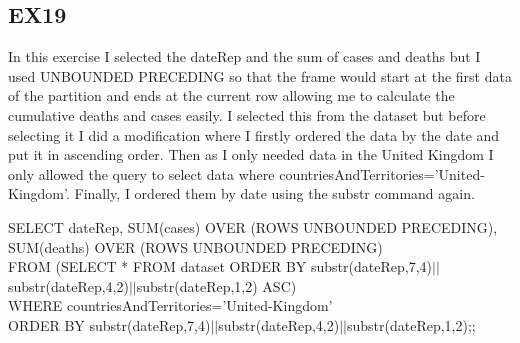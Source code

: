 \documentclass{article}
\begin{document}
\subsection{EX19}
In this exercise I selected the dateRep and the sum of cases and deaths but I used UNBOUNDED PRECEDING so that the frame would start at the first data of the partition and ends at the current row allowing me to calculate the cumulative deaths and cases easily. I selected this from the dataset but before selecting it I did a modification where I firstly ordered the data  by the date and put it in ascending order. Then as I only needed data in the United Kingdom I only allowed the query to select data where countriesAndTerritories='United-Kingdom'. Finally, I ordered them by date using the substr command again.
\begin{algorithm} 
SELECT dateRep, SUM(cases) OVER (ROWS UNBOUNDED PRECEDING), SUM(deaths) OVER (ROWS UNBOUNDED PRECEDING) \\
FROM (SELECT * FROM dataset ORDER BY substr(dateRep,7,4)$||$substr(dateRep,4,2)$||$substr(dateRep,1,2) ASC) \\
WHERE countriesAndTerritories='United-Kingdom' \\
ORDER BY substr(dateRep,7,4)$||$substr(dateRep,4,2)$||$substr(dateRep,1,2);;
\end{algorithm} \par
\end{document}
